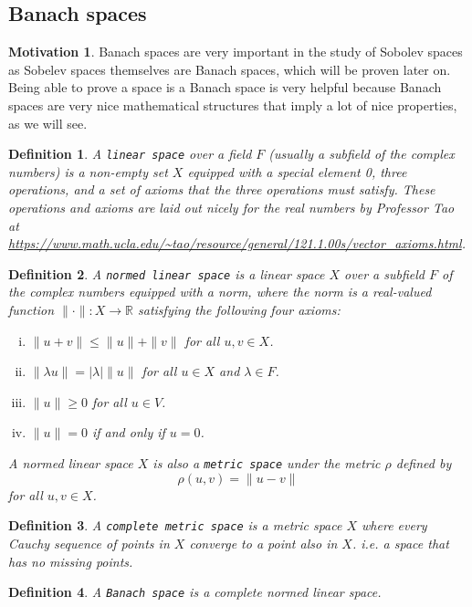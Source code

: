 \documentclass[11pt]{article}
\newtheorem{definition}{Definition}
\theoremstyle{definition}
\newtheorem*{motivation}{Motivation}
\begin{document}
\subsection{Banach spaces}
\begin{motivation}
Banach spaces are very important in the study of Sobolev spaces as Sobelev spaces themselves are Banach spaces, which will be proven later on.
Being able to prove a space is a Banach space is very helpful because Banach spaces are very nice mathematical structures that imply
a lot of nice properties, as we will see.
\end{motivation}
\begin{definition}
	A \texttt{linear space} over a field $F$ (usually a subfield of the complex numbers) is a non-empty set $X$ equipped with a special element 0, 
	three operations, and a set of
	axioms that the three operations must satisfy. These operations and axioms are laid out nicely for the real numbers by Professor Tao at
	\url{https://www.math.ucla.edu/~tao/resource/general/121.1.00s/vector_axioms.html}.
\end{definition}
\begin{definition}
	A \texttt{normed linear space} is a linear space $X$ over a subfield $F$ of the complex numbers equipped with a norm,
	where the norm is a real-valued function $\|\cdot\| : X \rightarrow \mathbb{R}$ satisfying the following four axioms:
	\begin{enumerate}[(i)]
		\item $\|u+v\| \leq \|u\|+\|v\|$ for all $u,v \in X$.
		\item $\|\lambda u\| = |\lambda|\|u\|$ for all $u \in X$ and $\lambda \in F$.
		\item $\|u\| \geq 0$ for all $u \in V$.
		\item $\|u\| = 0$ if and only if $u=0$.
	\end{enumerate}
	A normed linear space $X$ is also a \texttt{metric space} under the metric $\rho$ defined by
	\[\rho(u,v) = \|u-v\|\]
	for all $u,v \in X$.
\end{definition}
\begin{definition}
	A \texttt{complete metric space} is a metric space $X$ where every Cauchy sequence of points in $X$ converge to a point also in $X$.
	i.e. a space that has no missing points.
\end{definition}
\begin{definition}
	A \texttt{Banach space} is a complete normed linear space.
\end{definition}
\end{document}
